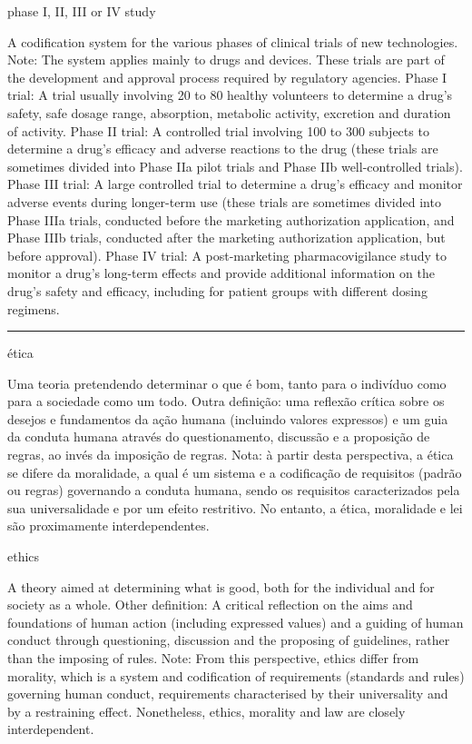 \documentclass[
]{book}
\begin{document}
phase I, II, III or IV study

A codification system for the various phases of clinical trials of new technologies. Note: The system applies mainly to drugs and devices. These trials are part of the development and approval process required by regulatory agencies. Phase I trial: A trial usually involving 20 to 80 healthy volunteers to determine a drug's safety, safe dosage range, absorption, metabolic activity, excretion and duration of activity. Phase II trial:
A controlled trial involving 100 to 300 subjects to determine a drug's efficacy and adverse reactions to the drug (these trials are sometimes divided into Phase IIa pilot trials and Phase IIb well-controlled trials). Phase III trial:
A large controlled trial to determine a drug's efficacy and monitor adverse events during longer-term use (these trials are sometimes divided into Phase IIIa trials, conducted before the marketing authorization application, and Phase IIIb trials, conducted after the marketing authorization application, but before approval). Phase IV trial:
A post-marketing pharmacovigilance study to monitor a drug's long-term effects and provide additional information on the drug's safety and efficacy, including for patient groups with different dosing regimens.

\begin{center}\rule{0.5\linewidth}{0.5pt}\end{center}

ética

Uma teoria pretendendo determinar o que é bom, tanto para o indivíduo como para a sociedade como um todo. Outra definição: uma reflexão crítica sobre os desejos e fundamentos da ação humana (incluindo valores expressos) e um guia da conduta humana através do questionamento, discussão e a proposição de regras, ao invés da imposição de regras. Nota: à partir desta perspectiva, a ética se difere da moralidade, a qual é um sistema e a codificação de requisitos (padrão ou regras) governando a conduta humana, sendo os requisitos caracterizados pela sua universalidade e por um efeito restritivo. No entanto, a ética, moralidade e lei são proximamente interdependentes.

ethics

A theory aimed at determining what is good, both for the individual and for society as a whole. Other definition: A critical reflection on the aims and foundations of human action (including expressed values) and a guiding of human conduct through questioning, discussion and the proposing of guidelines, rather than the imposing of rules. Note: From this perspective, ethics differ from morality, which is a system and codification of requirements (standards and rules) governing human conduct, requirements characterised by their universality and by a restraining effect. Nonetheless, ethics, morality and law are closely interdependent.
\end{document}
